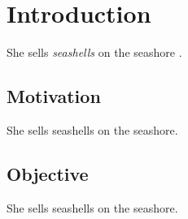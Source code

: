 \chapter{Introduction}

She sells \emph{seashells} on the seashore \cite{goodfellow2016}.

\section{Motivation}

She sells seashells on the seashore.

\section{Objective}

She sells seashells on the seashore.

